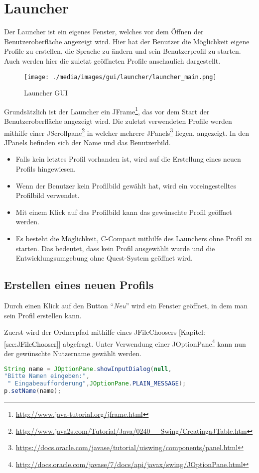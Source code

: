 \section{Launcher}
Der Launcher ist ein eigenes Fenster, welches vor dem Öffnen der Benutzeroberfläche angezeigt wird. Hier hat der Benutzer die Möglichkeit eigene Profile zu erstellen, die Sprache zu ändern und sein Benutzerprofil zu starten. Auch werden hier die zuletzt geöffneten Profile anschaulich dargestellt.

\begin{figure}[h] 
  \centering
     \texttt{[image: ./media/images/gui/launcher/launcher\_main.png]}
  \caption{Launcher GUI}
  \label{fig:launcher_GUI}
\end{figure}

Grundsätzlich ist der Launcher ein JFrame\footnote{\url{http://www.java-tutorial.org/jframe.html}}, das vor dem Start der Benutzeroberfläche angezeigt wird. Die zuletzt verwendeten Profile werden mithilfe einer JScrollpane\footnote{\url{http://www.java2s.com/Tutorial/Java/0240__Swing/CreatingaJTable.htm}}  in welcher mehrere JPanels\footnote{\url{https://docs.oracle.com/javase/tutorial/uiswing/components/panel.html}} liegen, angezeigt. In den JPanels befinden sich der Name und das Benutzerbild.

\begin{itemize}
\item Falls kein letztes Profil vorhanden ist, wird auf die Erstellung eines neuen Profils hingewiesen.
\item Wenn der Benutzer kein Profilbild gewählt hat, wird ein voreingestelltes Profilbild verwendet.
\item Mit einem Klick auf das Profilbild kann das gewünschte Profil geöffnet werden.
\item Es besteht die Möglichkeit, C-Compact mithilfe des Launchers ohne Profil zu starten. Das bedeutet, dass kein Profil ausgewählt wurde und die Entwicklungsumgebung ohne Quest-System geöffnet wird.
\end{itemize}

\subsection{Erstellen eines neuen Profils}
Durch einen Klick auf den Button "`\textit{Neu}"' wird ein Fenster geöffnet, in dem man sein Profil erstellen kann.  

Zuerst wird der Ordnerpfad mithilfe eines JFileChoosers [Kapitel: \ref{sec:JFileChooser}] abgefragt. Unter Verwendung einer JOptionPane\footnote{\url{http://docs.oracle.com/javase/7/docs/api/javax/swing/JOptionPane.html}}  kann nun der gewünschte Nutzername gewählt werden. 
\begin{lstlisting}[language=JAVA]
String name = JOptionPane.showInputDialog(null,
"Bitte Namen eingeben:",
 " Eingabeaufforderung",JOptionPane.PLAIN_MESSAGE);
p.setName(name);
\end{lstlisting}

